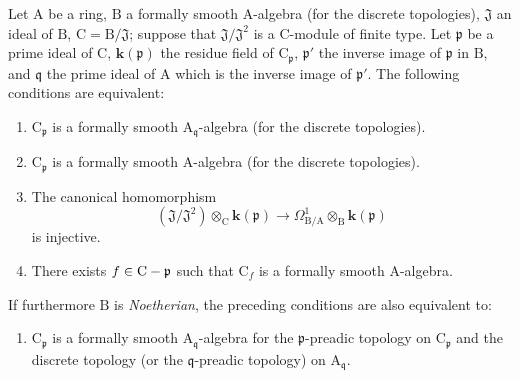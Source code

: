 \begin{proposition}[22.6.4]
\label{0.22.6.4}
Let $\mathrm{A}$ be a ring, $\mathrm{B}$ a formally smooth $\mathrm{A}$-algebra (for the discrete topologies), $\mathfrak{J}$ an ideal of $\mathrm{B}$, $\mathrm{C}=\mathrm{B}/\mathfrak{J}$; suppose that $\mathfrak{J}/\mathfrak{J}^2$ is a $\mathrm{C}$-module of finite type.
Let $\mathfrak{p}$ be a prime ideal of $\mathrm{C}$,
$\boldsymbol{k}(\mathfrak{p})$ the residue field of $\mathrm{C}_\mathfrak{p}$,
$\mathfrak{p}'$ the inverse image of $\mathfrak{p}$ in $\mathrm{B}$, and
$\mathfrak{q}$ the prime ideal of $\mathrm{A}$ which is the inverse image of
$\mathfrak{p}'$.
The following conditions are equivalent:
\begin{enumerate}
  \item[\textup{a)}] $\mathrm{C}_\mathfrak{p}$ is a formally smooth $\mathrm{A}_{\mathfrak{q}}$-algebra (for the discrete topologies).
  \item[\textup{a')}] $\mathrm{C}_\mathfrak{p}$ is a formally smooth $\mathrm{A}$-algebra (for the discrete topologies).
  \item[\textup{b)}] The canonical homomorphism
\[
\label{0.22.6.4.1}
  (\mathfrak{J}/\mathfrak{J}^2)\otimes_\mathrm{C}\boldsymbol{k}(\mathfrak{p})\to\Omega^1_{\mathrm{B}/\mathrm{A}}\otimes_\mathrm{B}\boldsymbol{k}(\mathfrak{p})
  \tag{22.6.4.1}
\]
  is injective.
  \item[\textup{c)}] There exists $f\in\mathrm{C}-\mathfrak{p}$ such that
  $\mathrm{C}_f$ is a formally smooth $\mathrm{A}$-algebra.
\end{enumerate}

If furthermore $\mathrm{B}$ is \emph{Noetherian}, the preceding conditions are also equivalent to:
\begin{enumerate}
  \item[\textup{d)}] $\mathrm{C}_\mathfrak{p}$ is a formally smooth
  $\mathrm{A}_{\mathfrak{q}}$-algebra for the $\mathfrak{p}$-preadic topology
  on $\mathrm{C}_\mathfrak{p}$ and the discrete topology (or the
  $\mathfrak{q}$-preadic topology) on $\mathrm{A}_{\mathfrak{q}}$.
\end{enumerate}
\end{proposition}


